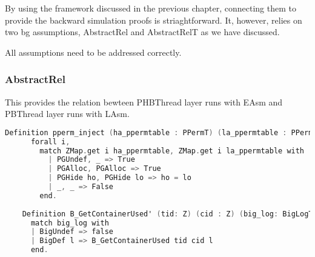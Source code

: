 By using the framework discussed in the previous chapter, connecting them to provide the backward simulation proofs is striaghtforward.
It, however, relies on two bg assumptions, 
AbstractRel and AbstractRelT as we have discussed. 

All assumptions need to be addressed correctly.

\subsubsection{AbstractRel}

This provides the relation bewteen PHBThread layer runs with EAsm and PBThread layer runs with LAsm. 

\begin{lstlisting}[language=C]
    Definition pperm_inject (ha_ppermtable : PPermT) (la_ppermtable : PPermT) : Prop := 
      forall i, 
        match ZMap.get i ha_ppermtable, ZMap.get i la_ppermtable with 
          | PGUndef, _ => True
          | PGAlloc, PGAlloc => True 
          | PGHide ho, PGHide lo => ho = lo
          | _, _ => False
        end.
    
    Definition B_GetContainerUsed' (tid: Z) (cid : Z) (big_log: BigLogType) : bool :=
      match big_log with 
      | BigUndef => false
      | BigDef l => B_GetContainerUsed tid cid l
      end.


\end{lstlisting}
